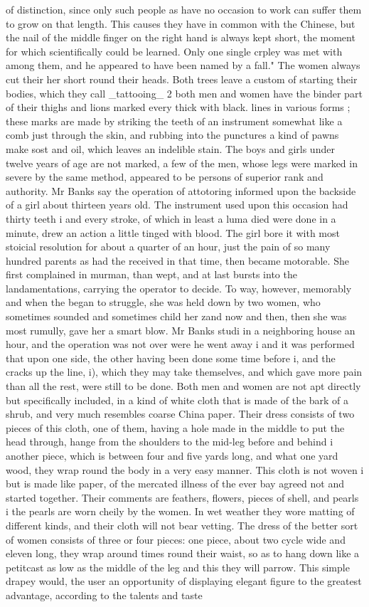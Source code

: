 \documentclass[11pt]{article}
\begin{document}
of distinction, since only such people as have no occasion to work can suffer them to grow on that length. This causes they have in common with the Chinese, but the nail of the middle finger on the right hand is always kept short, the moment for which scientifically could be learned. Only one single crpley was met with among them, and he appeared to have been named by a fall." The women always cut their her short round their heads. Both trees leave a custom of starting their bodies, which they call \_tattooing\_ 2 both men and women have the binder part of their thighs and lions marked every thick with black. lines in various forms ; these marks are made by striking the teeth of an instrument somewhat like a comb just through the skin, and rubbing into the punctures a kind of pawns make sost and oil, which leaves an indelible stain. The boys and girls under twelve years of age are not marked, a few of the men, whose legs were marked in severe by the same method, appeared to be persons of superior rank and authority. Mr Banks say the operation of attotoring informed upon the backside of a girl about thirteen years old. The instrument used upon this occasion had thirty teeth i and every stroke, of which in least a luma died were done in a minute, drew an action a little tinged with blood. The girl bore it with most stoicial resolution for about a quarter of an hour, just the pain of so many hundred parents as had the received in that time, then became motorable. She first complained in murman, than wept, and at last bursts into the landamentations, carrying the operator to decide. To way, however, memorably and when the began to struggle, she was held down by two women, who sometimes sounded and sometimes child her zand now and then, then she was most rumully, gave her a smart blow. Mr Banks studi in a neighboring house an hour, and the operation was not over were he went away i and it was performed that upon one side, the other having been done some time before i, and the cracks up the line, i), which they may take themselves, and which gave more pain than all the rest, were still to be done. Both men and women are not apt directly but specifically included, in a kind of white cloth that is made of the bark of a shrub, and very much resembles coarse China paper. Their dress consists of two pieces of this cloth, one of them, having a hole made in the middle to put the head through, hange from the shoulders to the mid-leg before and behind i another piece, which is between four and five yards long, and what one yard wood, they wrap round the body in a very easy manner. This cloth is not woven i but is made like paper, of the mercated illness of the ever bay agreed not and started together. Their comments are feathers, flowers, pieces of shell, and pearls i the pearls are worn cheily by the women. In wet weather they wore matting of different kinds, and their cloth will not bear vetting. The dress of the better sort of women consists of three or four pieces: one piece, about two cycle wide and eleven long, they wrap around times round their waist, so as to hang down like a petitcast as low as the middle of the leg and this they will parrow. This simple drapey would, the user an opportunity of displaying elegant figure to the greatest advantage, according to the talents and taste 
\end{document}

